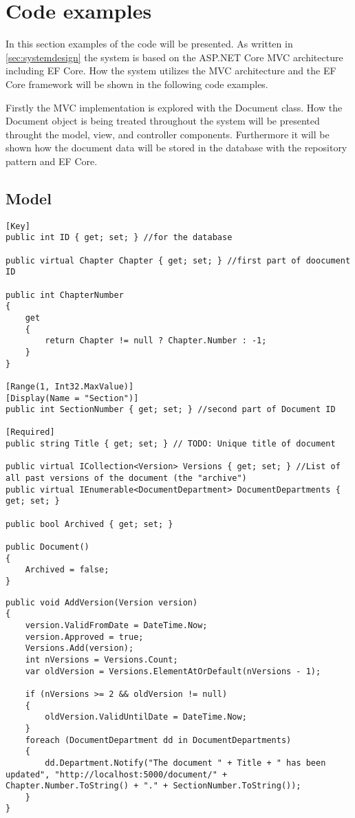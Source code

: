 \section{Code examples} 
In this section examples of the code will be presented.
As written in \cref{sec:systemdesign} the system is based on the ASP.NET Core MVC architecture including EF Core.
How the system utilizes the MVC architecture and the EF Core framework will be shown in the following code examples.

Firstly the MVC implementation is explored with the Document class.
How the Document object is being treated throughout the system will be presented throught the model, view, and controller components.
Furthermore it will be shown how the document data will be stored in the database with the repository pattern and EF Core.

\subsection{Model}

\begin{lstlisting}
[Key]
public int ID { get; set; } //for the database

public virtual Chapter Chapter { get; set; } //first part of doocument ID

public int ChapterNumber
{
	get
	{
		return Chapter != null ? Chapter.Number : -1;
	}
}

[Range(1, Int32.MaxValue)]
[Display(Name = "Section")]
public int SectionNumber { get; set; } //second part of Document ID

[Required]
public string Title { get; set; } // TODO: Unique title of document

public virtual ICollection<Version> Versions { get; set; } //List of all past versions of the document (the "archive")
public virtual IEnumerable<DocumentDepartment> DocumentDepartments { get; set; }

public bool Archived { get; set; }

public Document()
{
	Archived = false;
}

\end{lstlisting}

\begin{lstlisting}
public void AddVersion(Version version)
{
	version.ValidFromDate = DateTime.Now;
	version.Approved = true;
	Versions.Add(version);
	int nVersions = Versions.Count;
	var oldVersion = Versions.ElementAtOrDefault(nVersions - 1);

	if (nVersions >= 2 && oldVersion != null)
	{
		oldVersion.ValidUntilDate = DateTime.Now;
	}
	foreach (DocumentDepartment dd in DocumentDepartments)
	{
		dd.Department.Notify("The document " + Title + " has been updated", "http://localhost:5000/document/" + Chapter.Number.ToString() + "." + SectionNumber.ToString());
	}
}
\end{lstlisting}

